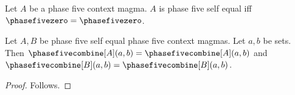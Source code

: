 

\begin{definition}\label{phase5_grouped_self_equal}
    Let $A$ be a phase five context magma.
    $A$ is phase five self equal iff $\phasefivezero=\phasefivezero$.
\end{definition}

\begin{proposition}\label{phase5_grouped_structure_assumption}
    Let $A,B$ be phase five self equal phase five context magmas.
    Let $a,b$ be sets.
    Then $\phasefivecombine[A](a,b)=\phasefivecombine[A](a,b)$ and
        $\phasefivecombine[B](a,b)=\phasefivecombine[B](a,b)$.
\end{proposition}
\begin{proof}
    Follows.
\end{proof}
